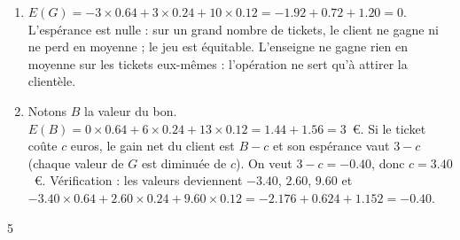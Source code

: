 {\begin{enumerate}
\[\begin{array}{|l|c|c|c|}
\end{array}
\]
Contrôle : $\num{0,64}+\num{0,24}+\num{0,12}=1$.
\item $E(G)=-3\times\num{0,64}+3\times\num{0,24}+10\times\num{0,12}=-\num{1,92}+\num{0,72}+\num{1,20}=0$.
L'espérance est nulle : sur un grand nombre de tickets, le client ne gagne ni ne perd en moyenne ; le jeu est équitable. L'enseigne ne gagne rien en moyenne sur les tickets eux-mêmes : l'opération ne sert qu'à attirer la clientèle.
\item Notons $B$ la valeur du bon. $E(B)=0\times\num{0,64}+6\times\num{0,24}+13\times\num{0,12}=\num{1,44}+\num{1,56}=3$~€. Si le ticket coûte $c$ euros, le gain net du client est $B-c$ et son espérance vaut $3-c$ (chaque valeur de $G$ est diminuée de $c$). On veut $3-c=-\num{0,40}$, donc $c=\num{3,40}$~€.
Vérification : les valeurs deviennent $-\num{3,40}$, $\num{2,60}$, $\num{9,60}$ et $-\num{3,40}\times\num{0,64}+\num{2,60}\times\num{0,24}+\num{9,60}\times\num{0,12}=-\num{2,176}+\num{0,624}+\num{1,152}=-\num{0,40}$.
\end{enumerate}
}{5}


